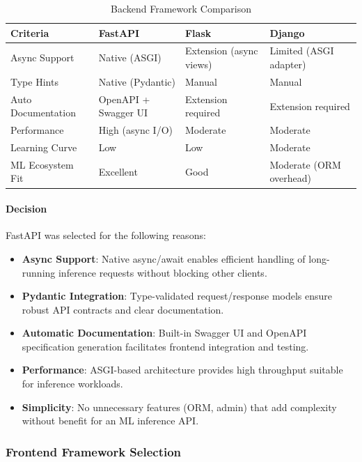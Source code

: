 \documentclass[12pt,a4paper]{report}
\begin{document}
\begin{table}[H]
\centering
\caption{Backend Framework Comparison}
\label{tab:backend_framework}
\small
\renewcommand{\arraystretch}{1.3}
\begin{tabular}{|p{2.8cm}|p{3.5cm}|p{3.2cm}|p{3.5cm}|}
\hline
\textbf{Criteria} & \textbf{FastAPI} & \textbf{Flask} & \textbf{Django} \\
\hline
Async Support & Native (ASGI) & Extension (async views) & Limited (ASGI adapter) \\
\hline
Type Hints & Native (Pydantic) & Manual & Manual \\
\hline
Auto Documentation & OpenAPI + Swagger UI & Extension required & Extension required \\
\hline
Performance & High (async I/O) & Moderate & Moderate \\
\hline
Learning Curve & Low & Low & Moderate \\
\hline
ML Ecosystem Fit & Excellent & Good & Moderate (ORM overhead) \\
\hline
\end{tabular}
\end{table}

\paragraph{Decision}

FastAPI was selected for the following reasons:
\begin{itemize}
    \item \textbf{Async Support}: Native async/await enables efficient handling of long-running inference requests without blocking other clients.
    \item \textbf{Pydantic Integration}: Type-validated request/response models ensure robust API contracts and clear documentation.
    \item \textbf{Automatic Documentation}: Built-in Swagger UI and OpenAPI specification generation facilitates frontend integration and testing.
    \item \textbf{Performance}: ASGI-based architecture provides high throughput suitable for inference workloads.
    \item \textbf{Simplicity}: No unnecessary features (ORM, admin) that add complexity without benefit for an ML inference API.
\end{itemize}

\subsubsection{Frontend Framework Selection}
\end{document}
